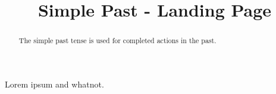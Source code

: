 \documentclass{ximera}
\title{Simple Past - Landing Page}
\begin{document}
\begin{abstract}
The simple past tense is used for completed actions in the past.
\end{abstract}
\maketitle

Lorem ipsum and whatnot.
\end{document}
